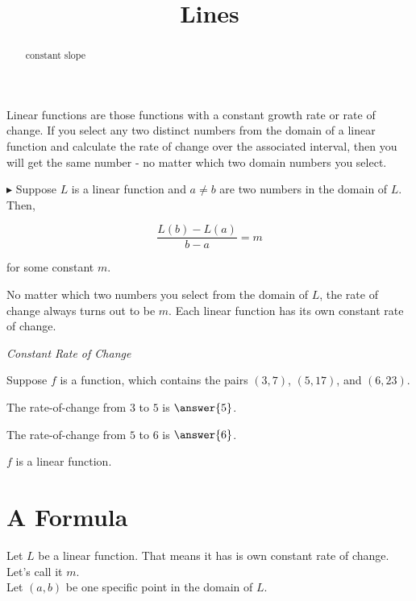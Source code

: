 \documentclass{ximera}
\title{Lines}
\begin{document}
\begin{abstract}
constant slope
\end{abstract}
\maketitle


Linear functions are those functions with a constant growth rate or rate of change.  If you select any two distinct numbers from the domain of a linear function and calculate the rate of change over the associated interval, then you will get the same number - no matter which two domain numbers you select.

$\blacktriangleright$ Suppose $L$ is a linear function and $a \ne b$ are two numbers in the domain of $L$. Then, 

\[    \frac{L(b) - L(a)}{b - a} = m   \]

for some constant $m$.


No matter which two numbers you select from the domain of $L$, the rate of change always turns out to be $m$.  Each linear function has its own constant rate of change.




\begin{example} \textit{Constant Rate of Change}


Suppose $f$ is a function, which contains the pairs $(3, 7)$, $(5, 17)$, and $(6, 23)$.


The rate-of-change from $3$ to $5$ is $\answer{5}$.

The rate-of-change from $5$ to $6$ is $\answer{6}$.

$f$ is a linear function.
\begin{multipleChoice}
\end{multipleChoice}


\end{example}



\section{A Formula}

Let $L$ be a linear function.  That means it has is own constant rate of change.  Let's call it $m$. \\

Let $(a, b)$ be one specific point in the domain of $L$.\\
\end{document}
